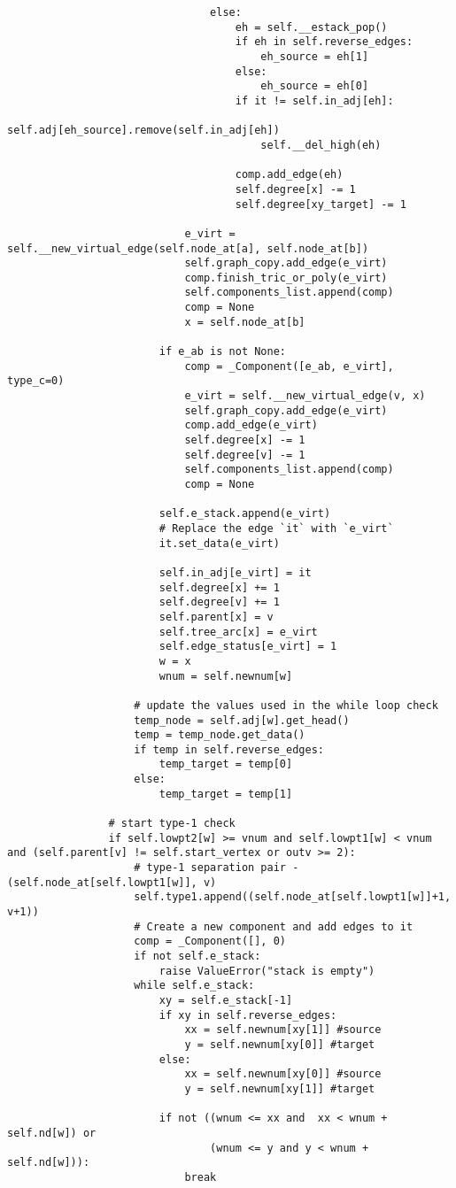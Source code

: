 \begin{verbatim}
								else:
									eh = self.__estack_pop()
									if eh in self.reverse_edges:
										eh_source = eh[1]
									else:
										eh_source = eh[0]
									if it != self.in_adj[eh]:
										self.adj[eh_source].remove(self.in_adj[eh])
										self.__del_high(eh)

									comp.add_edge(eh)
									self.degree[x] -= 1
									self.degree[xy_target] -= 1

							e_virt = self.__new_virtual_edge(self.node_at[a], self.node_at[b])
							self.graph_copy.add_edge(e_virt)
							comp.finish_tric_or_poly(e_virt)
							self.components_list.append(comp)
							comp = None
							x = self.node_at[b]

						if e_ab is not None:
							comp = _Component([e_ab, e_virt], type_c=0)
							e_virt = self.__new_virtual_edge(v, x)
							self.graph_copy.add_edge(e_virt)
							comp.add_edge(e_virt)
							self.degree[x] -= 1
							self.degree[v] -= 1
							self.components_list.append(comp)
							comp = None

						self.e_stack.append(e_virt)
						# Replace the edge `it` with `e_virt`
						it.set_data(e_virt)

						self.in_adj[e_virt] = it
						self.degree[x] += 1
						self.degree[v] += 1
						self.parent[x] = v
						self.tree_arc[x] = e_virt
						self.edge_status[e_virt] = 1
						w = x
						wnum = self.newnum[w]

					# update the values used in the while loop check
					temp_node = self.adj[w].get_head()
					temp = temp_node.get_data()
					if temp in self.reverse_edges:
						temp_target = temp[0]
					else:
						temp_target = temp[1]

				# start type-1 check
				if self.lowpt2[w] >= vnum and self.lowpt1[w] < vnum and (self.parent[v] != self.start_vertex or outv >= 2):
					# type-1 separation pair - (self.node_at[self.lowpt1[w]], v)
					self.type1.append((self.node_at[self.lowpt1[w]]+1, v+1))
					# Create a new component and add edges to it
					comp = _Component([], 0)
					if not self.e_stack:
						raise ValueError("stack is empty")
					while self.e_stack:
						xy = self.e_stack[-1]
						if xy in self.reverse_edges:
							xx = self.newnum[xy[1]] #source
							y = self.newnum[xy[0]] #target
						else:
							xx = self.newnum[xy[0]] #source
							y = self.newnum[xy[1]] #target

						if not ((wnum <= xx and  xx < wnum + self.nd[w]) or
								(wnum <= y and y < wnum + self.nd[w])):
							break


\end{verbatim}
